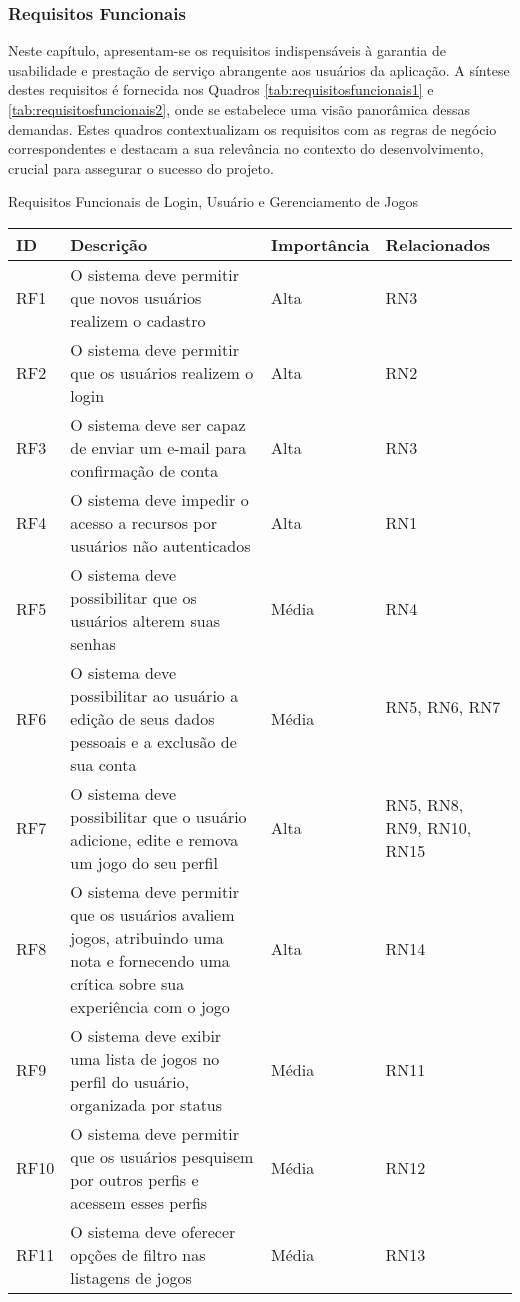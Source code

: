 \clearpage
\subsubsection{Requisitos Funcionais}
\label{sec:req_funcionais}

Neste capítulo, apresentam-se os requisitos indispensáveis à garantia de usabilidade e prestação de serviço abrangente aos usuários da aplicação. A síntese destes requisitos é fornecida nos Quadros \ref{tab:requisitosfuncionais1} e \ref{tab:requisitosfuncionais2}, onde se estabelece uma visão panorâmica dessas demandas. Estes quadros contextualizam os requisitos com as regras de negócio correspondentes e destacam a sua relevância no contexto do desenvolvimento, crucial para assegurar o sucesso do projeto.

\begin{quadro}[h!]
\caption{Requisitos Funcionais de Login, Usuário e Gerenciamento de Jogos}
\label{tab:requisitosfuncionais1}
\begin{longtable}{|p{2.5cm}|p{7.5cm}|p{2.5cm}|p{2.5cm}|}
\hline
ID & Descrição & Importância & Relacionados
\\\hline
RF1 & O sistema deve permitir que novos usuários realizem o cadastro & Alta & RN3 \
\\\hline
RF2 & O sistema deve permitir que os usuários realizem o login & Alta & RN2 \
\\\hline
RF3 & O sistema deve ser capaz de enviar um e-mail para confirmação de conta & Alta & RN3 \
\\\hline
RF4 & O sistema deve impedir o acesso a recursos por usuários não autenticados & Alta & RN1 \
\\\hline
RF5 & O sistema deve possibilitar que os usuários alterem suas senhas & Média & RN4 \
\\\hline
RF6 & O sistema deve possibilitar ao usuário a edição de seus dados pessoais e a exclusão de sua conta & Média & RN5, RN6, RN7 \
\\\hline
RF7 & O sistema deve possibilitar que o usuário adicione, edite e remova um jogo do seu perfil & Alta & RN5, RN8, RN9, RN10, RN15 \
\\\hline
RF8 & O sistema deve permitir que os usuários avaliem jogos, atribuindo uma nota e fornecendo uma crítica sobre sua experiência com o jogo & Alta & RN14 \
\\\hline
RF9 & O sistema deve exibir uma lista de jogos no perfil do usuário, organizada por status & Média & RN11 \
\\\hline
RF10 & O sistema deve permitir que os usuários pesquisem por outros perfis e acessem esses perfis & Média & RN12 \
\\\hline
RF11 & O sistema deve oferecer opções de filtro nas listagens de jogos & Média & RN13 \
\\\hline
\end{longtable}
\fonte{Os Autores.}
\end{quadro}

